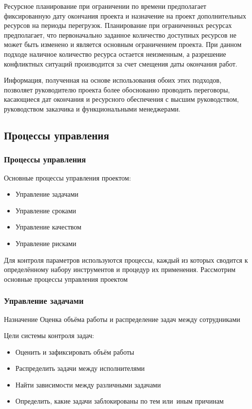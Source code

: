 \documentclass{../industrial-development}
\begin{document}
Ресурсное планирование при ограничении по времени предполагает фиксированную дату окончания проекта и назначение на проект дополнительных ресурсов на периоды перегрузок. Планирование при ограниченных ресурсах предполагает, что первоначально заданное количество доступных ресурсов не может быть изменено и является основным ограничением проекта. При данном подходе наличное количество ресурса остается неизменным, а разрешение конфликтных ситуаций производится за счет смещения даты окончания работ.

Информация, полученная на основе использования обоих этих подходов, позволяет руководителю проекта более обоснованно проводить переговоры, касающиеся дат окончания и ресурсного обеспечения с высшим руководством, руководством заказчика и функциональными менеджерами.

    \subsection{Процессы управления}

\begin{frame} \frametitle{Процессы управления}
	Основные процессы управления проектом:
	\begin{itemize}
		\item Управление задачами
		\item Управление сроками
		\item Управление качеством
		\item Управление рисками
	\end{itemize}
\end{frame}
\lecturenotes

Для контроля параметров используются процессы, каждый из которых сводится к определённому набору инструментов и процедур их применения. Рассмотрим основные процессы управления проектом

\begin{frame} \frametitle{Управление задачами}
	\begin{block}{Назначение}
		Оценка объёма работы и распределение задач между сотрудниками
	\end{block}
	Цели системы контроля задач:
	\begin{itemize}
		\item Оценить и зафиксировать объём работы
		\item Распределить задачи между исполнителями
		\item Найти зависимости между различными задачами
		\item Определить, какие задачи заблокированы по тем или~иным причинам
	\end{itemize}
\end{frame}
\lecturenotes
\end{document}
